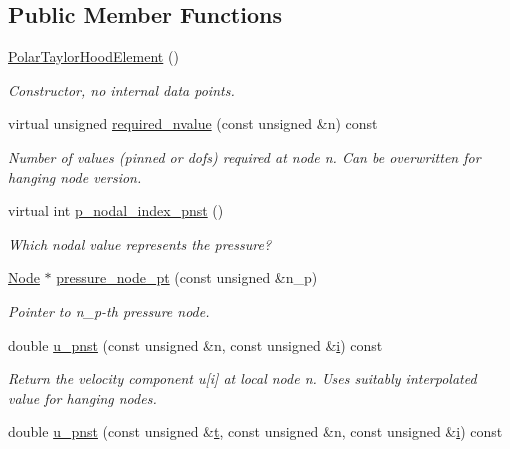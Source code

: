 \subsection*{Public Member Functions}
\begin{DoxyCompactItemize}
\item 
\hyperlink{classoomph_1_1PolarTaylorHoodElement_ad2cc8fe3224677102d198dcfda486925}{Polar\+Taylor\+Hood\+Element} ()
\begin{DoxyCompactList}\small\item\em Constructor, no internal data points. \end{DoxyCompactList}\item 
virtual unsigned \hyperlink{classoomph_1_1PolarTaylorHoodElement_a471a225bdcb0f6f1babd03f6e152da79}{required\+\_\+nvalue} (const unsigned \&n) const
\begin{DoxyCompactList}\small\item\em Number of values (pinned or dofs) required at node n. Can be overwritten for hanging node version. \end{DoxyCompactList}\item 
virtual int \hyperlink{classoomph_1_1PolarTaylorHoodElement_af7ced5d7811bc4f5f5d86c211cb40500}{p\+\_\+nodal\+\_\+index\+\_\+pnst} ()
\begin{DoxyCompactList}\small\item\em Which nodal value represents the pressure? \end{DoxyCompactList}\item 
\hyperlink{classoomph_1_1Node}{Node} $\ast$ \hyperlink{classoomph_1_1PolarTaylorHoodElement_a8843c94923e754967be8765c77d8c0a0}{pressure\+\_\+node\+\_\+pt} (const unsigned \&n\+\_\+p)
\begin{DoxyCompactList}\small\item\em Pointer to n\+\_\+p-\/th pressure node. \end{DoxyCompactList}\item 
double \hyperlink{classoomph_1_1PolarTaylorHoodElement_a7a584a50123314fdfc35798e8c604383}{u\+\_\+pnst} (const unsigned \&n, const unsigned \&\hyperlink{cfortran_8h_adb50e893b86b3e55e751a42eab3cba82}{i}) const
\begin{DoxyCompactList}\small\item\em Return the velocity component u\mbox{[}i\mbox{]} at local node n. Uses suitably interpolated value for hanging nodes. \end{DoxyCompactList}\item 
double \hyperlink{classoomph_1_1PolarTaylorHoodElement_ad1faa74e287808e3a2ebc493d6e78686}{u\+\_\+pnst} (const unsigned \&\hyperlink{cfortran_8h_af6f0bd3dc13317f895c91323c25c2b8f}{t}, const unsigned \&n, const unsigned \&\hyperlink{cfortran_8h_adb50e893b86b3e55e751a42eab3cba82}{i}) const

\end{DoxyCompactItemize}
